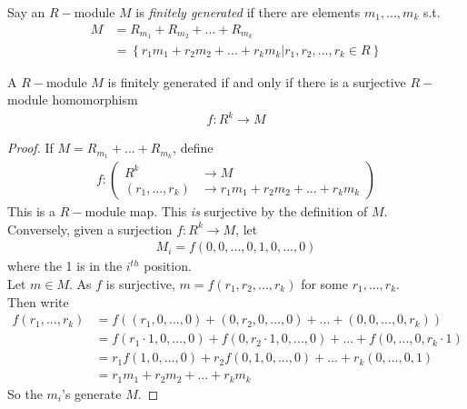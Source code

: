 \documentclass[a4paper]{article}
\begin{document}
\begin{defi}
Say an $R-$module $M$ is \emph{finitely generated} if there are elements $m_1,...,m_k$ s.t.
\begin{equation*}
\begin{aligned}
M&=R_{m_1} + R_{m_2} + ... + R_{m_k}\\
&= \left\{r_1 m_1 + r_2 m_2 + ... + r_k m_k|r_1,r_2,...,r_k\in R\right\}
\end{aligned}
\end{equation*}
\end{defi}

\begin{lemma}
A $R-$module $M$ is finitely generated if and only if there is a surjective $R-$module homomorphism
\begin{equation*}
\begin{aligned}
f: R^k \to M
\end{aligned}
\end{equation*}
\begin{proof}
If $M=R_{m_1}+...+R_{m_k}$, define
\begin{equation*}
\begin{aligned}
f:\left(
\begin{array}{ll}
R^k &\to M\\
\left(r_1,...,r_k\right) &\to r_1 m_1 + r_2 m_2 + ... + r_k m_k
\end{array}
\right)
\end{aligned}
\end{equation*}
This is a $R-$module map. This \emph{is} surjective by the definition of $M$.\\
Conversely, given a surjection $f:R^k \to M$, let
\begin{equation*}
\begin{aligned}
M_i = f\left(0,0,...,0,1,0,...,0\right)
\end{aligned}
\end{equation*}
where the 1 is in the $i^{th}$ position.\\
Let $m\in M$. As $f$ is surjective, $m=f\left(r_1,r_2,...,r_k\right)$ for some $r_1,...,r_k$.\\
Then write
\begin{equation*}
\begin{aligned}
f\left(r_1,...,r_k\right) &= f\left(\left(r_1,0,...,0\right) + \left(0,r_2,0,...,0\right)+...+\left(0,0,...,0,r_k\right)\right)\\
&=f\left(r_1\cdot 1,0,...,0\right)+f\left(0,r_2\cdot 1,0,...,0\right) + ... + f\left(0,...,0,r_k\cdot 1\right)\\
&=r_1 f\left(1,0,...,0\right) + r_2 f\left(0,1,0,...,0\right) + ... + r_k\left(0,...,0,1\right)\\
&=r_1 m_1 + r_2 m_2 + ... + r_k m_k
\end{aligned}
\end{equation*}
So the $m_i$'s generate $M$.
\end{proof}
\end{lemma}
\end{document}
